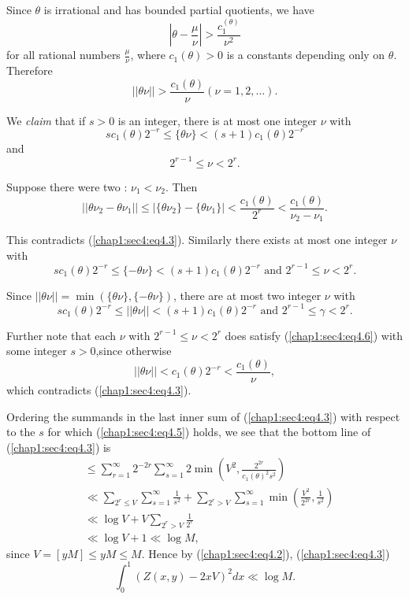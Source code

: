 Since $\theta$ is irrational and has bounded partial quotients, we have
$$
\left|\theta - \frac{\mu}{\nu}\right| > \frac{c_{1}^{(\theta)}}{\nu^{2}}
$$
for all rational numbers $\frac{\mu}{\nu}$, where $c_{1} (\theta) > 0$ is a constants depending only on $\theta$. Therefore
\begin{equation*}
 ||\theta \nu|| > \frac{c_{1}(\theta)}{\nu} (\nu = 1, 2, \ldots).\tag{4.4}\label{chap1:sec4:eq4.4}
\end{equation*}

We {\em claim} that if $s > 0$ is an integer, there is at most one integer $\nu$ with
\begin{equation*}   
  sc_{1} (\theta)2^{-r}  \leq \{\theta \nu\} < (s + 1)c_{1} (\theta)2^{-r}\tag{4.5}\label{chap1:sec4:eq4.5}
\end{equation*}
and
$$
2^{r-1} \leq \nu < 2^{r}.
$$

Suppose there were two : $\nu_{1} < \nu_{2}$. Then
$$
||\theta \nu_{2} - \theta \nu_{1}|| \leq \left|\{\theta \nu_{2}\} - \{\theta \nu_{1}\}\right|< \frac{c_{1}(\theta)}{2^{r}} < \frac{c_{1}(\theta)}{\nu_{2} - \nu_{1}}.
$$

This contradicts (\ref{chap1:sec4:eq4.3}). Similarly there exists at most one integer $\nu$ with 
$$
sc_{1} (\theta) 2^{-r} \leq \{-\theta \nu\} < (s+1)c_{1}(\theta) 2^{-r}\text{ and } 2^{r-1} \leq \nu < 2^{r}.
$$

Since $||\theta \nu|| = \min (\{\theta \nu\}, \{-\theta \nu\})$, there are at most two integer $\nu$ with
\begin{equation*}
sc_{1} (\theta) 2^{-r}  \leq ||\theta \nu||<(s+1)c_{1}(\theta)2^{-r} \text{ and } 2^{r-1} \leq \gamma < 2^{r}.\tag{4.6}\label{chap1:sec4:eq4.6}
\end{equation*}

Further note that each $\nu$ with $2^{r-1} \leq \nu < 2^{r}$ does satisfy (\ref{chap1:sec4:eq4.6}) with some integer $s > 0$,\pageoriginale since otherwise
$$
||\theta \nu|| < c_{1} (\theta) 2^{-r} < \frac{c_{1} (\theta)}{\nu},
$$
which contradicts (\ref{chap1:sec4:eq4.3}).

Ordering the summands in the last inner sum of (\ref{chap1:sec4:eq4.3}) with respect to the $s$ for which (\ref{chap1:sec4:eq4.5}) holds, we see that the bottom line of (\ref{chap1:sec4:eq4.3}) is
\begin{align*}
& \leq \sum_{r=1}^{\infty} 2^{-2r} \sum_{s=1}^{\infty} 2 \min \left(V^{2}, \frac{2^{2r}}{c_{1} (\theta)^{2} s^{2}}\right)\\
& \ll \sum_{2^{r} \leq V} \sum_{s=1}^{\infty} \frac{1}{s^{2}} + \sum_{2^{r}> V} \sum_{s=1}^{\infty} \min \left(\frac{V^{2}}{2^{2r}}, \frac{1}{s^{2}}\right)\\
& \ll \log V + V \sum_{2^{r} > V} \frac{1}{2^{r}}\\
& \ll \log V + 1 \ll \log M,
\end{align*}
since $V = [yM] \leq yM \leq M$. Hence by (\ref{chap1:sec4:eq4.2}), (\ref{chap1:sec4:eq4.3})
$$
\int_{0}^{1} (Z(x, y) -2xV)^{2} dx \ll \log M.
$$

